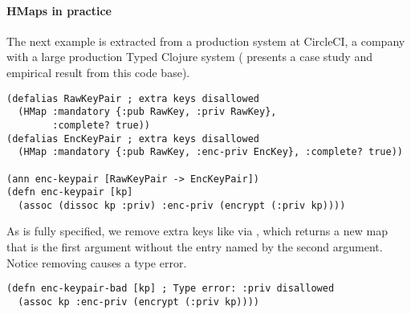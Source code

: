 \paragraph{HMaps in practice} The next example is extracted from a production system at CircleCI,
a company with a large production Typed Clojure system
( presents a case study and empirical
result from this code base).

\begin{exmp}
\begin{lstlisting}
(defalias RawKeyPair ; extra keys disallowed
  (HMap :mandatory {:pub RawKey, :priv RawKey}, 
        :complete? true))
(defalias EncKeyPair ; extra keys disallowed
  (HMap :mandatory {:pub RawKey, :enc-priv EncKey}, :complete? true))

(ann enc-keypair [RawKeyPair -> EncKeyPair])
(defn enc-keypair [kp]
  (assoc (dissoc kp :priv) :enc-priv (encrypt (:priv kp))))
\end{lstlisting}
\label{example:circleci}
\end{exmp}
%
%
As  is fully specified, we remove extra keys like 
via , which returns a new map that is the first argument without the
entry named by the second argument. Notice removing  causes a type error.
%
\begin{lstlisting}
(defn enc-keypair-bad [kp] ; Type error: :priv disallowed
  (assoc kp :enc-priv (encrypt (:priv kp))))
\end{lstlisting}


